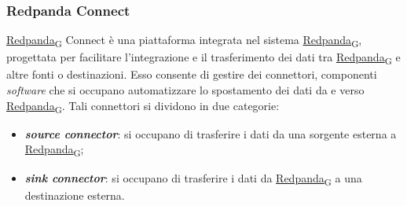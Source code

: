 \subsubsection{Redpanda Connect}\label{redpanda_connect}
\href{https://7last.github.io/docs/pb/documentazione-interna/glossario\#redpanda}{Redpanda\textsubscript{G}} Connect è una piattaforma integrata nel sistema \href{https://7last.github.io/docs/pb/documentazione-interna/glossario\#redpanda}{Redpanda\textsubscript{G}}, progettata per facilitare l'integrazione e il trasferimento dei dati tra \href{https://7last.github.io/docs/pb/documentazione-interna/glossario\#redpanda}{Redpanda\textsubscript{G}} e altre fonti o destinazioni.
Esso consente di gestire dei connettori, componenti \textit{software} che si occupano automatizzare lo spostamento dei dati da e verso \href{https://7last.github.io/docs/pb/documentazione-interna/glossario\#redpanda}{Redpanda\textsubscript{G}}. Tali connettori si dividono in due categorie:
\begin{itemize}
	\item \textbf{\textit{source connector}}: si occupano di trasferire i dati da una sorgente esterna a \href{https://7last.github.io/docs/pb/documentazione-interna/glossario\#redpanda}{Redpanda\textsubscript{G}};
	\item \textbf{\textit{sink connector}}: si occupano di trasferire i dati da \href{https://7last.github.io/docs/pb/documentazione-interna/glossario\#redpanda}{Redpanda\textsubscript{G}} a una destinazione esterna.
\end{itemize}

